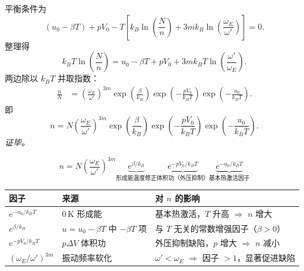 \begin{derivationbox}[标准解题过程]
平衡条件为
\begin{equation}
(u_0 - \beta T) + pV_0 - T\left[k_{\!B}\ln\!\left(\frac{N}{n}\right) + 3mk_{\!B}\ln\!\left(\frac{\omega_E}{\omega'}\right)\right] = 0.
\end{equation}
整理得
\begin{equation}
k_{\!B}T\ln\!\left(\frac{N}{n}\right)
= u_0 - \beta T + pV_0 + 3mk_{\!B}T\ln\!\left(\frac{\omega'}{\omega_E}\right).
\end{equation}
两边除以 $k_{\!B}T$ 并取指数：
\begin{align}
\frac{n}{N}
&= \left(\frac{\omega_E}{\omega'}\right)^{\!3m}
\exp\!\left(\frac{\beta}{k_{\!B}}\right)
\exp\!\left(-\frac{pV_0}{k_{\!B}T}\right)
\exp\!\left(-\frac{u_0}{k_{\!B}T}\right).
\end{align}
即
\begin{equation}
\boxed{
n = N\left(\frac{\omega_E}{\omega'}\right)^{\!3m}
\exp\!\left(\frac{\beta}{k_{\!B}}\right)
\exp\!\left(-\frac{pV_0}{k_{\!B}T}\right)
\exp\!\left(-\frac{u_0}{k_{\!B}T}\right).
}
\end{equation}
\textit{证毕。}
\end{derivationbox}

\begin{formulabox}[答案汇总与各项物理意义]
\begin{equation}
n = N\left(\frac{\omega_E}{\omega'}\right)^{\!3m}
\underbrace{e^{\beta/k_{\!B}}}_{\text{形成能温度修正}}
\underbrace{e^{-pV_0/k_{\!B}T}}_{\text{体积功（外压抑制）}}
\underbrace{e^{-u_0/k_{\!B}T}}_{\text{基本热激活因子}}
\end{equation}
\vspace{4pt}
\begin{center}
\begin{tabular}{lll}
\toprule
\textbf{因子} & \textbf{来源} & \textbf{对 $n$ 的影响} \\
\midrule
$e^{-u_0/k_{\!B}T}$ & $0\,\mathrm{K}$ 形成能 & 基本热激活，$T$ 升高 $\Rightarrow$ $n$ 增大 \\
$e^{\beta/k_{\!B}}$ & $u=u_0-\beta T$ 中 $-\beta T$ 项 & 与 $T$ 无关的常数增强因子（$\beta>0$） \\
$e^{-pV_0/k_{\!B}T}$ & $p\Delta V$ 体积功 & 外压抑制缺陷，$p$ 增大 $\Rightarrow$ $n$ 减小 \\
$(\omega_E/\omega')^{3m}$ & 振动频率软化 & $\omega'<\omega_E$ $\Rightarrow$ 因子 $>1$，显著促进缺陷 \\
\bottomrule
\end{tabular}
\end{center}
\end{formulabox}

